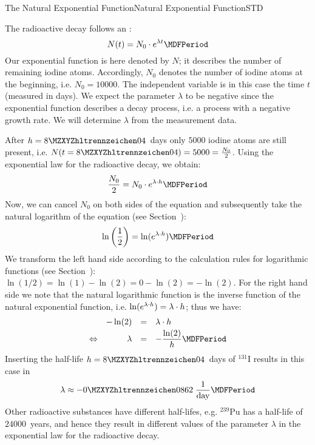 \begin{MXContent}{The Natural Exponential Function}{Natural Exponential Function}{STD}
\begin{MExample}
  The radioactive decay follows an : 
  $$N(t) = N_0 \cdot \MEU^{\lambda t} \MDFPeriod$$
  Our exponential function is here denoted by $N$; it describes the number of remaining iodine atoms.
  Accordingly, $N_0$ denotes the number of iodine atoms at the beginning, i.e. $N_0 = 10000$. 
  The independent variable is in this case the time $t$ (measured in days). We expect the 
  parameter $\lambda$ to be negative since the exponential function describes a decay
  process, i.e. a process with a negative growth rate. We will determine $\lambda$
  from the measurement data.
  
  After $h = \MZahl{8}{04}$~days only $5000$ iodine atoms are still present, i.e. 
  $N(t = \MZahl{8}{04}) = 5000 = \Mtfrac{N_0}{2}$. Using the exponential law for the 
  radioactive decay, we obtain:
  $$\Mdfrac{N_0}{2} = N_0 \cdot \MEU^{\lambda \cdot h}  \MDFPeriod$$
  Now, we can cancel $N_0$ on both sides of the equation and subsequently take the
  natural logarithm of the equation (see Section~): 
  $$\ln \left( \Mdfrac12 \right ) = \ln(\MEU^{\lambda \cdot h})  \MDFPeriod$$
  We transform the left hand side according to the calculation rules for logarithmic functions
  (see Section~): $\ln(1/2) = \ln(1) - \ln(2) = 0 - \ln(2) = - \ln(2)$.
  For the right hand side we note that the natural logarithmic function is the inverse 
  function of the natural exponential function, i.e. $\ln(e^{\lambda \cdot h}) = \lambda \cdot h$;
  thus we have:
  $$\begin{array}{crcl} & - \ln(2) & = & \lambda \cdot h \\[.5ex]
  \Leftrightarrow & \lambda & = & - \Mdfrac{\ln(2)}{h}  \MDFPeriod \end{array}$$
  Inserting the half-life $h = \MZahl{8}{04}$~days of $^{131}\mathrm{I}$ results in this case
  in 
  $$\lambda \approx - \MZahl{0}{0862} \; \Mdfrac{1}{\text{day}}  \MDFPeriod$$
  Other radioactive substances have different half-lifes, e.g. $^{239}\mathrm{Pu}$ has 
  a half-life of $24000$~years, and hence they result in different values of the 
  parameter $\lambda$ in the exponential law for the radioactive decay.
 \end{MExample}
\end{MXContent}



